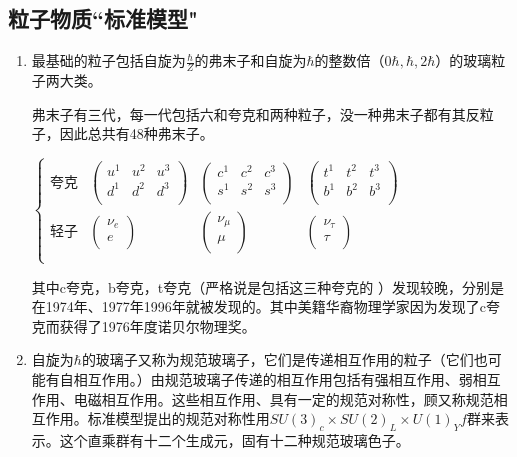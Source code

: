 \subsection{粒子物质“标准模型"}
\begin{enumerate}
\item
最基础的粒子包括自旋为$\frac{\hbar}{Z}$的弗末子和自旋为$\hbar$的整数倍（$0\hbar,\hbar,2\hbar$）的玻璃粒子两大类。
 
   弗末子有三代，每一代包括六和夸克和两种粒子，没一种弗末子都有其反粒子，因此总共有48种弗末子。
   
$
\left\{  \begin{array}{llll}  
\mbox{夸克}  &  {\left(\begin{array}{ccc}  u^1  &  u^2  &  u^3 \\ d^1 & d^2  & d^3 \\ \end{array}  \right)}  &   { \left(  \begin{array}{ccc}   c^1  &  c^2   &  c^3  \\ s^1  &  s^2  & s^3 \\  \end{array}  \right) }  &  { \left( \begin{array} {ccc}  t^1  &  t^2  &  t^3  \\ b^1  &  b^2  &  b^3 \\  \end{array}  \right) }\\
 \mbox{轻子}  &   { \left ( \begin{array}{c}  \nu_e\\ e \\  \end{array}  \right) }    &  {\left (\begin{array}{c}\nu_\mu\\\mu\\ \end{array} \right) }  &  { \left( \begin{array}{c} \nu_\tau \\ \tau \\  \end{array}  \right) } \\
\end{array}  \right.$

  
 其中c夸克，b夸克，t夸克（严格说是包括这三种夸克的       ）发现较晚，分别是在1974年、1977年1996年就被发现的。其中美籍华裔物理学家因为发现了c夸克而获得了1976年度诺贝尔物理奖。  
\item
自旋为$\hbar$的玻璃子又称为规范玻璃子，它们是传递相互作用的粒子（它们也可能有自相互作用。）由规范玻璃子传递的相互作用包括有强相互作用、弱相互作用、电磁相互作用。这些相互作用、具有一定的规范对称性，顾又称规范相互作用。标准模型提出的规范对称性用$SU(3)_c \times SU(2)_L \times U(1)_Yf $群来表示。这个直乘群有十二个生成元，固有十二种规范玻璃色子。
  

\end{enumerate}

